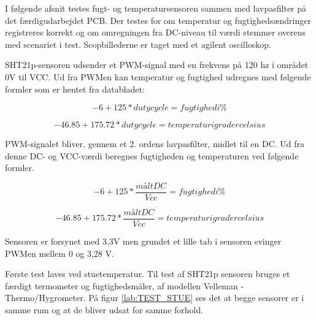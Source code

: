 

I følgende afsnit testes fugt- og temperatursensoren sammen med lavpasfilter på det færdigudarbejdet PCB. Der testes for om temperatur og fugtighedsændringer registreres korrekt og om omregningen fra DC-niveau til værdi stemmer overens med scenariet i test. Scopbillederne er taget med et agilent oscilloskop.

SHT21p-sensoren udsender et PWM-signal med en frekvens på 120 hz i området 0V til VCC. Ud fra PWMen kan temperatur og fugtighed udregnes med følgende formler som er hentet fra databladet:

\begin{equation}
-6+125*duty cycle= fugtighed i \%
\end{equation}

\begin{equation}
-46.85+175.72*duty cycle= temperatur i grader celsius
\end{equation}

PWM-signalet bliver, gennem et 2. ordens lavpasfilter, midlet til en DC. Ud fra denne DC-
og VCC-værdi beregnes fugtigheden og temperaturen ved følgende formler.


\begin{equation}
-6+125*\frac{målt DC}{Vcc}= fugtighed i \%
\end{equation}

\begin{equation}
-46.85+175.72*\frac{målt DC}{Vcc}=temperatur i grader celsius
\end{equation}

Sensoren er forsynet med 3,3V men grundet et lille tab i sensoren svinger PWMen mellem
0 og 3,28 V.




Første test laves ved stuetemperatur. Til test af SHT21p sensoren bruges et færdigt termometer og fugtighedsmåler, af modellen Velleman - Thermo/Hygrometer. På figur \ref{lab:TEST_STUE} ses det at begge sensorer er i samme rum og at de bliver udsat for samme forhold. 


